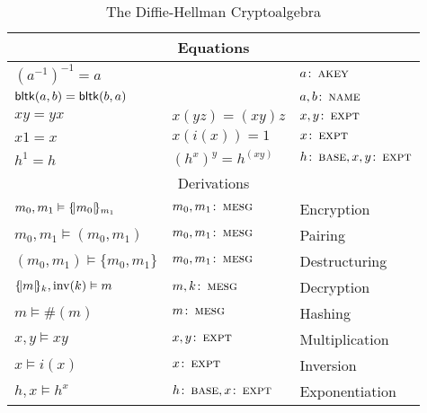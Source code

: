 \begin{table}
\begin{tabular}{|lll|}
\multicolumn{3}{c}{Equations}\\ \hline
%
$(a^{-1})^{-1} = a$ & & $a \colon \scap{akey}$\\
$\operatorname{\mathsf{bltk}}(a,b) = \operatorname{\mathsf{bltk}}(b,a)$ & & $a, b \colon \scap{name}$ \\
$xy = yx$ & $x(yz) = (xy)z$ & $x, y \colon \scap{expt}$\\
$x1 = x$ & $x(i(x)) = 1$ & $x \colon \scap{expt}$ \\
$h^1 = h$ & $(h^x)^y = h^{(xy)}$ & $h \colon \scap{base}, x, y \colon \scap{expt}$ \\
\hline
\multicolumn{3}{c}{Derivations}\\ \hline
$m_0, m_1 \vDash \{\!|m_0|\!\}_{m_1}$ & $m_0, m_1 \colon \scap{mesg}$ & Encryption \\
$m_0, m_1 \vDash (m_0, m_1)$ & $m_0, m_1 \colon \scap{mesg}$ & Pairing \\
$(m_0, m_1) \vDash \{m_0, m_1\}$ & $m_0, m_1 \colon \scap{mesg}$ & Destructuring \\
$\{\!|m|\!\}_{k}, \mathrm{inv}(k) \vDash m$ & $m, k \colon \scap{mesg}$ & Decryption \\
$m \vDash \#(m)$ & $m \colon \scap{mesg}$ & Hashing\\
$x, y \vDash xy$ & $x, y \colon \scap{expt}$ & Multiplication\\
$x \vDash i(x)$ & $x \colon \scap{expt}$ & Inversion\\
$h, x \vDash h^x$ & $h \colon \scap{base}, x \colon \scap{expt}$ & Exponentiation\\
\hline
%
\end{tabular}
\caption{The Diffie-Hellman Cryptoalgebra}
\label{tab:dh_algebra_signature}
\end{table}

